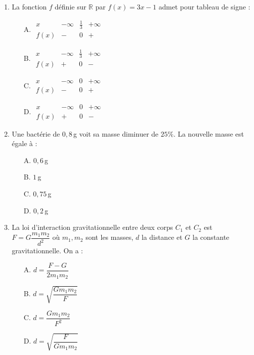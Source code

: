 \documentclass[a4paper,12pt]{article}
\begin{document}
\begin{enumerate}
\item La fonction \(f\) définie sur \(\mathbb{R}\) par \(f(x) = 3x - 1\) admet pour tableau de signe :
\begin{itemize}
\item[A.]
$\begin{array}{c|ccc}
x & -\infty & \frac{1}{3} & +\infty \\ \hline
f(x) & - & 0 & +
\end{array}$
\item[B.]
$\begin{array}{c|ccc}
x & -\infty & \frac{1}{3} & +\infty \\ \hline
f(x) & + & 0 & -
\end{array}$
\item[C.]
$\begin{array}{c|ccc}
x & -\infty & 0 & +\infty \\ \hline
f(x) & - & 0 & +
\end{array}$
\item[D.]
$\begin{array}{c|ccc}
x & -\infty & 0 & +\infty \\ \hline
f(x) & + & 0 & -
\end{array}$
\end{itemize}

\item Une bactérie de \(0{,}8\)\,g voit sa masse diminuer de \(25\%\). La nouvelle masse est égale à :
\begin{itemize}
\item[A.] \(0{,}6\)\,g
\item[B.] \(1\)\,g
\item[C.] \(0{,}75\)\,g
\item[D.] \(0{,}2\)\,g
\end{itemize}

\item La loi d'interaction gravitationnelle entre deux corps \(C_1\) et \(C_2\) est
\(F = G\dfrac{m_1 m_2}{d^2}\) où \(m_1, m_2\) sont les masses, \(d\) la distance et \(G\) la constante gravitationnelle. On a :
\begin{itemize}
\item[A.] \(d = \dfrac{F - G}{2m_1 m_2}\)
\item[B.] \(d = \sqrt{\dfrac{G m_1 m_2}{F}}\)
\item[C.] \(d = \dfrac{G m_1 m_2}{F^2}\)
\item[D.] \(d = \sqrt{\dfrac{F}{G m_1 m_2}}\)
\end{itemize}


\end{enumerate}
\end{document}

